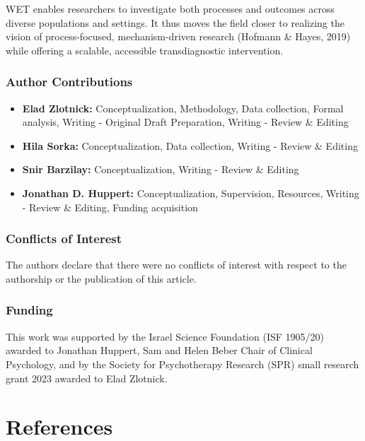 \documentclass[
  man,floatsintext]{apa7}
\providecommand{\tightlist}{%
  \setlength{\itemsep}{0pt}\setlength{\parskip}{0pt}}
\begin{document}
WET enables researchers to investigate both processes and outcomes across diverse populations and settings.
It thus moves the field closer to realizing the vision of process-focused, mechanism-driven research (Hofmann \& Hayes, 2019) while offering a scalable, accessible transdiagnostic intervention.

\newpage

\subsubsection{Author Contributions}\label{author-contributions}

\begin{itemize}
\tightlist
\item
  \textbf{Elad Zlotnick:} Conceptualization, Methodology, Data collection, Formal analysis, Writing - Original Draft Preparation, Writing - Review \& Editing
\item
  \textbf{Hila Sorka:} Conceptualization, Data collection, Writing - Review \& Editing
\item
  \textbf{Snir Barzilay:} Conceptualization, Writing - Review \& Editing
\item
  \textbf{Jonathan D. Huppert:} Conceptualization, Supervision, Resources, Writing - Review \& Editing, Funding acquisition
\end{itemize}

\subsubsection{Conflicts of Interest}\label{conflicts-of-interest}

The authors declare that there were no conflicts of interest with respect to the authorship or the publication of this article.

\subsubsection{Funding}\label{funding}

This work was supported by the Israel Science Foundation (ISF 1905/20) awarded to Jonathan Huppert, Sam and Helen Beber Chair of Clinical Psychology, and by the Society for Psychotherapy Research (SPR) small research grant 2023 awarded to Elad Zlotnick.

\newpage

\section{References}\label{references}
\end{document}
